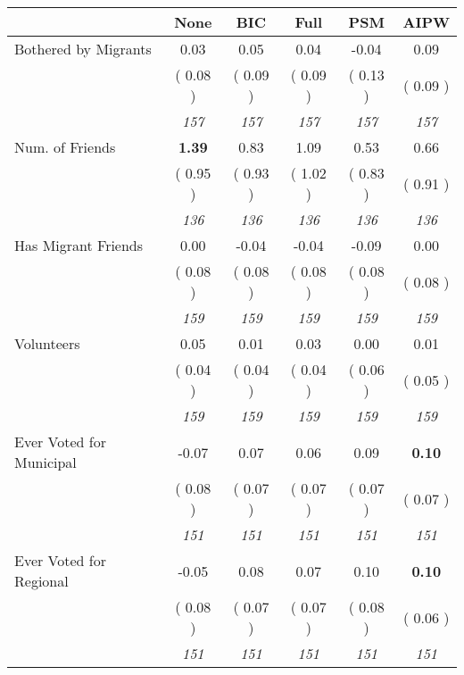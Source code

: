 \begin{tabular}{l c c c c c}
\toprule
 & None & BIC & Full & PSM & AIPW \\
\midrule
Bothered by Migrants &      0.03 &      0.05 &      0.04 &     -0.04 &      0.09 \\
& (     0.08 ) & (     0.09 ) & (     0.09 ) & (     0.13 ) & (     0.09 ) \\
& \textit{ 157 } & \textit{ 157 } & \textit{ 157 } & \textit{ 157 } & \textit{ 157 } \\
Num. of Friends & \textbf{      1.39 } &      0.83 &      1.09 &      0.53 &      0.66 \\
& (     0.95 ) & (     0.93 ) & (     1.02 ) & (     0.83 ) & (     0.91 ) \\
& \textit{ 136 } & \textit{ 136 } & \textit{ 136 } & \textit{ 136 } & \textit{ 136 } \\
Has Migrant Friends &      0.00 &     -0.04 &     -0.04 &     -0.09 &      0.00 \\
& (     0.08 ) & (     0.08 ) & (     0.08 ) & (     0.08 ) & (     0.08 ) \\
& \textit{ 159 } & \textit{ 159 } & \textit{ 159 } & \textit{ 159 } & \textit{ 159 } \\
Volunteers &      0.05 &      0.01 &      0.03 &      0.00 &      0.01 \\
& (     0.04 ) & (     0.04 ) & (     0.04 ) & (     0.06 ) & (     0.05 ) \\
& \textit{ 159 } & \textit{ 159 } & \textit{ 159 } & \textit{ 159 } & \textit{ 159 } \\
Ever Voted for Municipal &     -0.07 &      0.07 &      0.06 &      0.09 & \textbf{     0.10} \\
& (     0.08 ) & (     0.07 ) & (     0.07 ) & (     0.07 ) & (     0.07 ) \\
& \textit{ 151 } & \textit{ 151 } & \textit{ 151 } & \textit{ 151 } & \textit{ 151 } \\
Ever Voted for Regional &     -0.05 &      0.08 &      0.07 &      0.10 & \textbf{     0.10} \\
& (     0.08 ) & (     0.07 ) & (     0.07 ) & (     0.08 ) & (     0.06 ) \\
& \textit{ 151 } & \textit{ 151 } & \textit{ 151 } & \textit{ 151 } & \textit{ 151 } \\
\bottomrule
\end{tabular}
